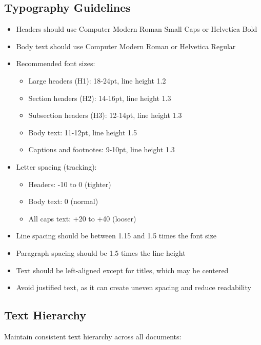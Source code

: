 \documentclass[11pt]{article}
\begin{document}
\subsection{Typography Guidelines}

\begin{itemize}[leftmargin=1cm, itemindent=0.25cm, noitemsep, topsep=0pt, label=$\bullet$]
    \item Headers should use Computer Modern Roman Small Caps or Helvetica Bold
    \item Body text should use Computer Modern Roman or Helvetica Regular
    \item Recommended font sizes:
    \begin{itemize}
        \item Large headers (H1): 18-24pt, line height 1.2
        \item Section headers (H2): 14-16pt, line height 1.3
        \item Subsection headers (H3): 12-14pt, line height 1.3
        \item Body text: 11-12pt, line height 1.5
        \item Captions and footnotes: 9-10pt, line height 1.3
    \end{itemize}
    \item Letter spacing (tracking):
    \begin{itemize}
        \item Headers: -10 to 0 (tighter)
        \item Body text: 0 (normal)
        \item All caps text: +20 to +40 (looser)
    \end{itemize}
    \item Line spacing should be between 1.15 and 1.5 times the font size
    \item Paragraph spacing should be 1.5 times the line height
    \item Text should be left-aligned except for titles, which may be centered
    \item Avoid justified text, as it can create uneven spacing and reduce readability
\end{itemize}

\subsection{Text Hierarchy}

Maintain consistent text hierarchy across all documents:
\end{document}
